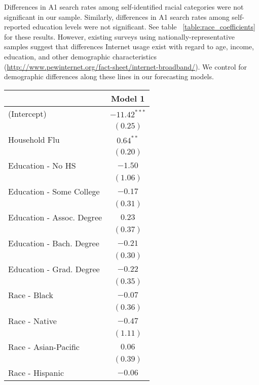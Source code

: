 \documentclass[12pt]{article}
\begin{document}
Differences in A1 search rates among self-identified racial categories were not significant in our sample. Similarly, differences in A1 search rates among self-reported education levels were not significant. See table ~\ref{table:race_coefficients} for these results. However, existing surveys using nationally-representative samples suggest that differences Internet usage exist with regard to age, income, education, and other demographic characteristics (\url{http://www.pewinternet.org/fact-sheet/internet-broadband/}). We control for demographic differences along these lines in our forecasting models.

\begin{table}
\begin{center}
\begin{tabular}{l c }
\hline
 & Model 1 \\
\hline
(Intercept)            & $-11.42^{***}$ \\
                       & $(0.25)$       \\
Household Flu          & $0.64^{**}$    \\
                       & $(0.20)$       \\
Education - No HS         & $-1.50$        \\
                       & $(1.06)$       \\
Education - Some College  & $-0.17$        \\
                       & $(0.31)$       \\
Education - Assoc. Degree & $0.23$         \\
                       & $(0.37)$       \\
Education - Bach. Degree  & $-0.21$        \\
                       & $(0.30)$       \\
Education - Grad. Degree  & $-0.22$        \\
                       & $(0.35)$       \\
Race - Black              & $-0.07$        \\
                       & $(0.36)$       \\
Race - Native             & $-0.47$        \\
                       & $(1.11)$       \\
Race - Asian-Pacific      & $0.06$         \\
                       & $(0.39)$       \\
Race - Hispanic           & $-0.06$        \\

\end{tabular}
\end{center}
\end{table}
\end{document}
